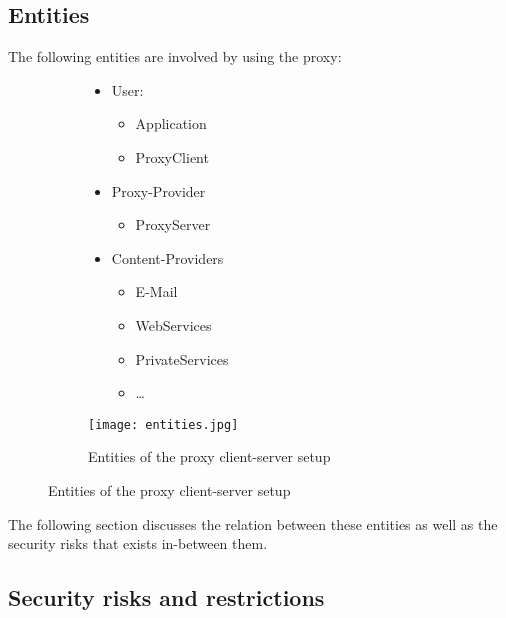 \documentclass[12pt, a4paper]{scrartcl}
\begin{document}
\subsection{Entities}
The following entities are involved by using the proxy:
\begin{figure}[H]
    \centering
    \begin{subfigure}{0.45\textwidth}
        \begin{itemize}
            \item User:
            \begin{itemize}
                \item Application
                \item ProxyClient
            \end{itemize}
            \item Proxy-Provider
            \begin{itemize}
                \item ProxyServer
            \end{itemize}
            \item Content-Providers
            \begin{itemize}
                \item E-Mail
                \item WebServices
                \item PrivateServices
                \item \ldots
            \end{itemize}
        \end{itemize}
    \end{subfigure}
    \begin{subfigure}{0.5\textwidth}
        \centering
        \texttt{[image: entities.jpg]}
        \caption{Entities of the proxy client-server setup}
        \label{fig::enti}
    \end{subfigure}
\end{figure}

\noindent The following section discusses the relation between these entities as well as the security risks that exists in-between them.
\subsection{Security risks and restrictions}
\end{document}
